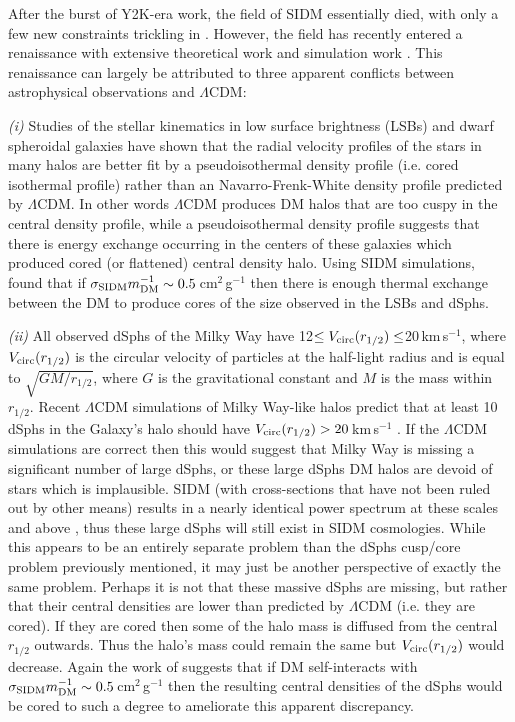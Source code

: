 After the burst of Y2K-era work, the field of SIDM essentially died, with only a few new constraints trickling in \citep{Randall:2008hs, Dawson:2012dl, Merten:2011gu}.
However, the field has recently entered a renaissance with extensive theoretical work \citep{ArkaniHamed:2009gk, Feng:2010kh, Tulin:2012jt, Tulin:2013eo, Ackerman:2009ia, Pospelov:2008di} and simulation work \citep{Peter:2012vi, Rocha:2012tr, Vogelsberger:2012dy, Vogelsberger:2013bb, Zavala:2013iq}.
This renaissance can largely be attributed to three apparent conflicts between astrophysical observations and $\Lambda$CDM:

{\it (i)} Studies of the stellar kinematics in low surface brightness (LSBs) and dwarf spheroidal galaxies \citep[dSphs;][]{Simon:2005fu, deNaray:2008iz, Oh:2011jd} have shown that the radial velocity profiles of the stars in many halos are better fit by a pseudoisothermal density profile (i.e. cored isothermal profile) rather than an Navarro-Frenk-White \citep[NFW;][]{Navarro:1996ce} density profile predicted by $\Lambda$CDM.
In other words $\Lambda$CDM produces DM halos that are too cuspy in the central density profile, while a pseudoisothermal density profile suggests that there is energy exchange occurring in the centers of these galaxies which produced cored (or flattened) central density halo.
Using SIDM simulations, \citet{Rocha:2012tr} found that if $\sigma_{\rm SIDM}m_{\rm DM}^{-1} \sim 0.5$\,cm$^2$\,g$^{-1}$ then there is enough thermal exchange between the DM to produce cores of the size observed in the LSBs and dSphs.

{\it (ii)} All observed dSphs of the Milky Way have 12$\leq V_{\rm circ}(r_{1/2}) \leq$20\,km\,s$^{-1}$, where $V_{\rm circ}(r_{1/2})$ is the circular velocity of particles at the half-light radius and is equal to $\sqrt{GM/r_{1/2}}$, where $G$ is the gravitational constant and $M$ is the mass within $r_{1/2}$.
Recent $\Lambda$CDM simulations of Milky Way-like halos predict that at least 10 dSphs in the Galaxy's halo should have $V_{\rm circ}(r_{1/2}) > 20$\,km\,s$^{-1}$ \citep{BoylanKolchin:2012id}.
If the $\Lambda$CDM simulations are correct then this would suggest that Milky Way is missing a significant number of large dSphs, or these large dSphs DM halos are devoid of stars which is implausible.
SIDM (with cross-sections that have not been ruled out by other means) results in a nearly identical power spectrum at these scales and above \citep{Rocha:2012tr}, thus these large dSphs will still exist in SIDM cosmologies.
While this appears to be an entirely separate problem than the dSphs cusp/core problem previously mentioned, it may just be another perspective of exactly the same problem.
Perhaps it is not that these massive dSphs are missing, but rather that their central densities are lower than predicted by $\Lambda$CDM (i.e. they are cored).
If they are cored then some of the halo mass is diffused from the central $r_{1/2}$ outwards.
Thus the halo's mass could remain the same but $V_{\rm circ}(r_{1/2})$ would decrease.
Again the work of \citet{Rocha:2012tr} suggests that if DM self-interacts with $\sigma_{\rm SIDM}m_{\rm DM}^{-1} \sim 0.5$\,cm$^2$\,g$^{-1}$ then the resulting central densities of the dSphs would be cored to such a degree to ameliorate this apparent discrepancy. 

